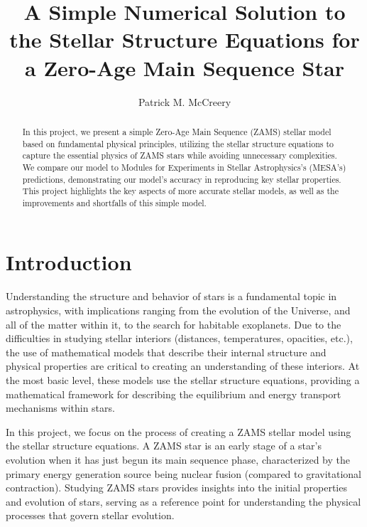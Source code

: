 \documentclass[twocolumn]{aastex631}
\begin{document}
\title{A Simple Numerical Solution to the Stellar Structure Equations for a Zero-Age Main Sequence Star}

\author{Patrick M. McCreery}


\begin{abstract}

In this project, we present a simple Zero-Age Main Sequence (ZAMS) stellar model based on fundamental physical principles, utilizing the stellar structure equations to capture the essential physics of ZAMS stars while avoiding unnecessary complexities. We compare our model to Modules for Experiments in Stellar Astrophysics's (MESA's) predictions, demonstrating our model's accuracy in reproducing key stellar properties. This project highlights the key aspects of more accurate stellar models, as well as the improvements and shortfalls of this simple model. 
\end{abstract}


\section{Introduction} \label{sec:intro}

Understanding the structure and behavior of stars is a fundamental topic in astrophysics, with implications ranging from the evolution of the Universe, and all of the matter within it, to the search for habitable exoplanets. Due to the difficulties in studying stellar interiors (distances, temperatures, opacities, etc.), the use of mathematical models that describe their internal structure and physical properties are critical to creating an understanding of these interiors. At the most basic level, these models use the stellar structure equations, providing a mathematical framework for describing the equilibrium and energy transport mechanisms within stars. 

In this project, we focus on the process of creating a ZAMS stellar model using the stellar structure equations. A ZAMS star is an early stage of a star's evolution when it has just begun its main sequence phase, characterized by the primary energy generation source being nuclear fusion (compared to gravitational contraction). Studying ZAMS stars provides insights into the initial properties and evolution of stars, serving as a reference point for understanding the physical processes that govern stellar evolution.
\end{document}
